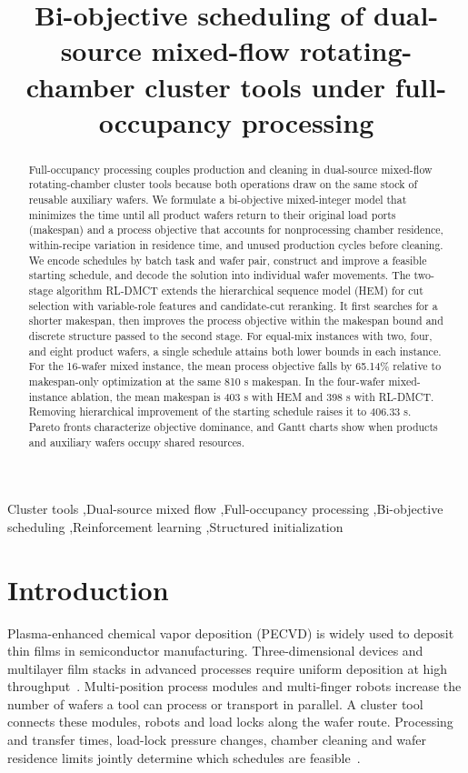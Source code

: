 \documentclass[preprint,12pt,nonatbib]{elsarticle}
\begin{document}
\raggedbottom
\begin{frontmatter}
\title{Bi-objective scheduling of dual-source mixed-flow rotating-chamber cluster tools under full-occupancy processing}
\begin{abstract}
Full-occupancy processing couples production and cleaning in dual-source mixed-flow rotating-chamber cluster tools because both operations draw on the same stock of reusable auxiliary wafers. We formulate a bi-objective mixed-integer model that minimizes the time until all product wafers return to their original load ports (makespan) and a process objective that accounts for nonprocessing chamber residence, within-recipe variation in residence time, and unused production cycles before cleaning. We encode schedules by batch task and wafer pair, construct and improve a feasible starting schedule, and decode the solution into individual wafer movements. The two-stage algorithm RL-DMCT extends the hierarchical sequence model (HEM) for cut selection with variable-role features and candidate-cut reranking. It first searches for a shorter makespan, then improves the process objective within the makespan bound and discrete structure passed to the second stage. For equal-mix instances with two, four, and eight product wafers, a single schedule attains both lower bounds in each instance. For the 16-wafer mixed instance, the mean process objective falls by 65.14\% relative to makespan-only optimization at the same 810 s makespan. In the four-wafer mixed-instance ablation, the mean makespan is 403 s with HEM and 398 s with RL-DMCT. Removing hierarchical improvement of the starting schedule raises it to 406.33 s. Pareto fronts characterize objective dominance, and Gantt charts show when products and auxiliary wafers occupy shared resources.
\end{abstract}
\begin{keyword}
Cluster tools \sep Dual-source mixed flow \sep Full-occupancy processing \sep Bi-objective scheduling \sep Reinforcement learning \sep Structured initialization
\end{keyword}
\end{frontmatter}
\modulolinenumbers[5]
\linenumbers
\section{Introduction}

Plasma-enhanced chemical vapor deposition (PECVD) is widely used to deposit thin films in semiconductor manufacturing. Three-dimensional devices and multilayer film stacks in advanced processes require uniform deposition at high throughput~\citep{xia2016pecvd,kim2023onstack}. Multi-position process modules and multi-finger robots increase the number of wafers a tool can process or transport in parallel. A cluster tool connects these modules, robots and load locks along the wafer route. Processing and transfer times, load-lock pressure changes, chamber cleaning and wafer residence limits jointly determine which schedules are feasible~\citep{pan2018survey}.
\end{document}
